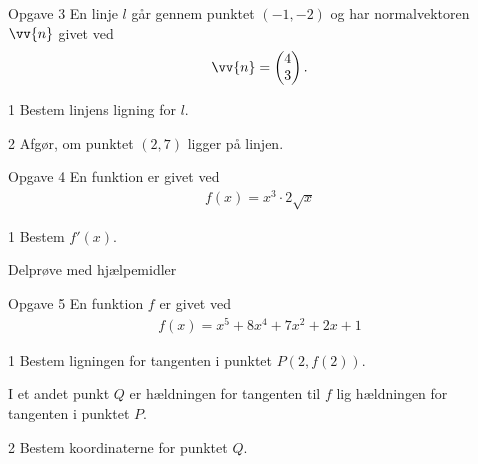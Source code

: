 \documentclass[12pt,x11names,a4paper]{article}
\begin{document}
\begin{opgavetekst}{Opgave 3}
	En linje $l$ går gennem punktet $(-1,-2)$ og har normalvektoren $\vv{n}$ givet ved
	\begin{align*}
		\vv{n} = 
		\begin{pmatrix}
			4 \\ 3
		\end{pmatrix}.
	\end{align*}	
\end{opgavetekst}
\begin{delopgave}{}{1}
	Bestem linjens ligning for $l$. 
\end{delopgave}
\begin{delopgave}{}{2}
	Afgør, om punktet $(2,7)$ ligger på linjen. 
\end{delopgave}
\newpage
\begin{opgavetekst}{Opgave 4}
	En funktion er givet ved
	\begin{align*}
		f(x) = x^3\cdot 2\sqrt{x}
	\end{align*}
\end{opgavetekst}
\begin{delopgave}{}{1}
	Bestem $f'(x)$. 
\end{delopgave}


\newpage
\begin{center}
\LARGE
Delprøve med hjælpemidler 
\end{center}
\begin{opgavetekst}{Opgave 5}
	En funktion $f$ er givet ved
	\begin{align*}
		f(x) = x^5 + 8x^4+7x^2+2x+1
	\end{align*}
\end{opgavetekst}
\begin{delopgave}{}{1}
	Bestem ligningen for tangenten i punktet $P(2,f(2))$.
\end{delopgave}
\begin{meretekst}
	I et andet punkt $Q$ er hældningen for tangenten til $f$ lig hældningen for tangenten i punktet $P$. 
\end{meretekst}
\begin{delopgave}{}{2}
	Bestem koordinaterne for punktet $Q$.
\end{delopgave}
\end{document}
